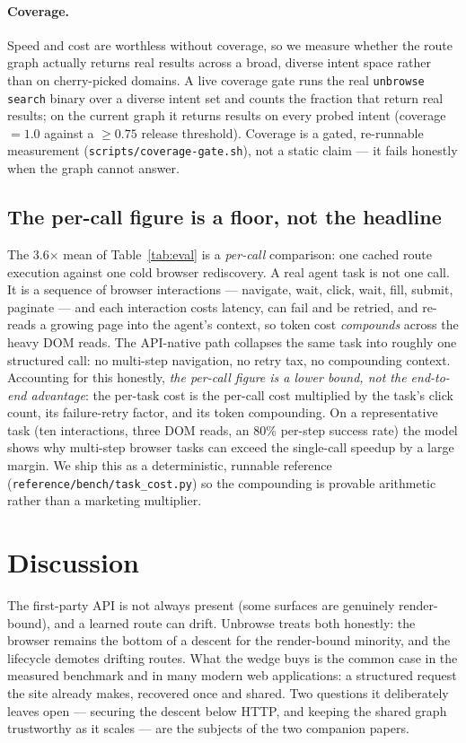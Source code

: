 \documentclass[11pt]{article}
\begin{document}
\paragraph{Coverage.} Speed and cost are worthless without coverage, so we measure
whether the route graph actually returns real results across a broad, diverse intent
space rather than on cherry-picked domains. A live coverage gate runs the real
\texttt{unbrowse search} binary over a diverse intent set and counts the fraction
that return real results; on the current graph it returns results on every probed
intent (coverage $=1.0$ against a $\geq 0.75$ release threshold). Coverage
is a gated, re-runnable measurement (\texttt{scripts/coverage-gate.sh}), not a static
claim --- it fails honestly when the graph cannot answer.

\subsection{The per-call figure is a floor, not the headline}
The 3.6$\times$ mean of Table~\ref{tab:eval} is a \emph{per-call} comparison: one
cached route execution against one cold browser rediscovery. A real agent task is
not one call. It is a sequence of browser interactions --- navigate, wait, click,
wait, fill, submit, paginate --- and each interaction costs latency, can fail and be
retried, and re-reads a growing page into the agent's context, so token cost
\emph{compounds} across the heavy DOM reads. The API-native path collapses the same
task into roughly one structured call: no multi-step navigation, no retry tax, no
compounding context. Accounting for this honestly, \emph{the per-call figure is a
lower bound, not the end-to-end advantage}: the per-task cost is the per-call cost
multiplied by the task's click count, its failure-retry factor, and its token
compounding. On a representative task (ten interactions, three DOM reads, an 80\%
per-step success rate) the model shows why multi-step browser tasks can exceed the
single-call speedup by a large margin. We ship this as a deterministic, runnable
reference (\texttt{reference/bench/task\_cost.py}) so the compounding is provable
arithmetic rather than a marketing multiplier.

\section{Discussion}
The first-party API is not always present (some surfaces are genuinely
render-bound), and a learned route can drift. Unbrowse treats both honestly: the
browser remains the bottom of a descent for the render-bound minority, and the
lifecycle demotes drifting routes. What the wedge buys is the common case in the
measured benchmark and in many modern web applications: a structured request the
site already makes, recovered once and shared. Two questions it deliberately leaves
open --- securing the descent below HTTP, and keeping the shared graph trustworthy
as it scales --- are the subjects of the two companion papers.
\end{document}
